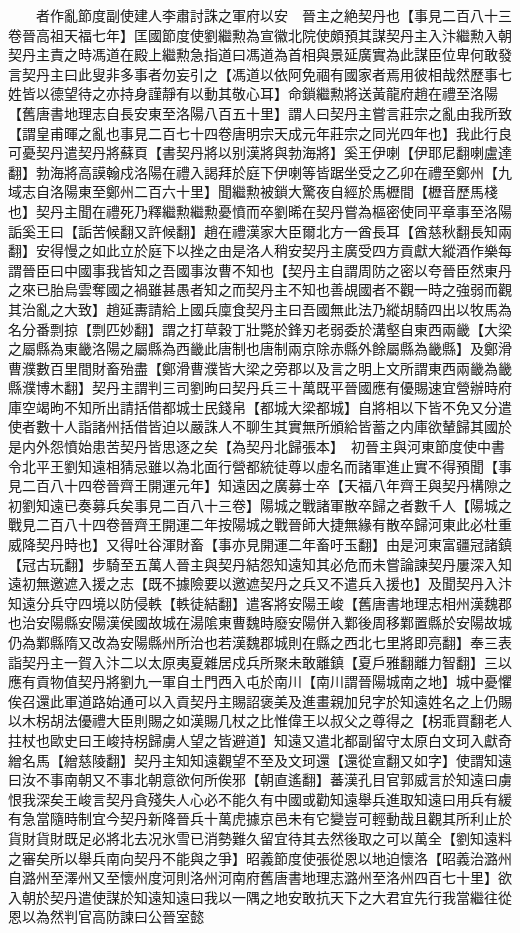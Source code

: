 　　者作亂節度副使建人李肅討誅之軍府以安　晉主之絶契丹也【事見二百八十三卷晉高祖天福七年】匡國節度使劉繼勲為宣徽北院使頗預其謀契丹主入汴繼勲入朝契丹主責之時馮道在殿上繼勲急指道曰馮道為首相與景延廣實為此謀臣位卑何敢發言契丹主曰此叟非多事者勿妄引之【馮道以依阿免祻有國家者焉用彼相哉然歷事七姓皆以德望待之亦持身謹靜有以動其敬心耳】命鎖繼勲將送黃龍府趙在禮至洛陽【舊唐書地理志自長安東至洛陽八百五十里】謂人曰契丹主嘗言莊宗之亂由我所致【謂皇甫暉之亂也事見二百七十四卷唐明宗天成元年莊宗之同光四年也】我此行良可憂契丹遣契丹將蘇頁【書契丹將以别漢將與勃海將】奚王伊喇【伊耶尼翻喇盧達翻】勃海將高謨翰戍洛陽在禮入謁拜於庭下伊喇等皆踞坐受之乙卯在禮至鄭州【九域志自洛陽東至鄭州二百六十里】聞繼勲被鎖大驚夜自經於馬櫪間【櫪音歷馬棧也】契丹主聞在禮死乃釋繼勲繼勲憂憤而卒劉晞在契丹嘗為樞密使同平章事至洛陽詬奚王曰【詬苦候翻又許候翻】趙在禮漢家大臣爾北方一酋長耳【酋慈秋翻長知兩翻】安得慢之如此立於庭下以挫之由是洛人稍安契丹主廣受四方貢獻大縱酒作樂每謂晉臣曰中國事我皆知之吾國事汝曹不知也【契丹主自謂周防之密以夸晉臣然東丹之來已胎烏雲奪國之禍雖甚愚者知之而契丹主不知也善覘國者不觀一時之強弱而觀其治亂之大致】趙延夀請給上國兵廩食契丹主曰吾國無此法乃縱胡騎四出以牧馬為名分番剽掠【剽匹妙翻】謂之打草穀丁壯斃於鋒刃老弱委於溝壑自東西兩畿【大梁之屬縣為東畿洛陽之屬縣為西畿此唐制也唐制兩京除赤縣外餘屬縣為畿縣】及鄭滑曹濮數百里間財畜殆盡【鄭滑曹濮皆大梁之旁郡以及言之明上文所謂東西兩畿為畿縣濮博木翻】契丹主謂判三司劉昫曰契丹兵三十萬既平晉國應有優賜速宜營辦時府庫空竭昫不知所出請括借都城士民錢帛【都城大梁都城】自將相以下皆不免又分遣使者數十人詣諸州括借皆迫以嚴誅人不聊生其實無所頒給皆蓄之内庫欲輦歸其國於是内外怨憤始患苦契丹皆思逐之矣【為契丹北歸張本】　初晉主與河東節度使中書令北平王劉知遠相猜忌雖以為北面行營都統徒尊以虛名而諸軍進止實不得預聞【事見二百八十四卷晉齊王開運元年】知遠因之廣募士卒【天福八年齊王與契丹構隙之初劉知遠已奏募兵矣事見二百八十三卷】陽城之戰諸軍散卒歸之者數千人【陽城之戰見二百八十四卷晉齊王開運二年按陽城之戰晉師大捷無緣有散卒歸河東此必杜重威降契丹時也】又得吐谷渾財畜【事亦見開運二年畜吁玉翻】由是河東富疆冠諸鎮【冠古玩翻】步騎至五萬人晉主與契丹結怨知遠知其必危而未嘗論諫契丹屢深入知遠初無邀遮入援之志【既不據險要以邀遮契丹之兵又不遣兵入援也】及聞契丹入汴知遠分兵守四境以防侵軼【軼徒結翻】遣客將安陽王峻【舊唐書地理志相州漢魏郡也治安陽縣安陽漢侯國故城在湯隂東曹魏時廢安陽併入鄴後周移鄴置縣於安陽故城仍為鄴縣隋又改為安陽縣州所治也若漢魏郡城則在縣之西北七里將即亮翻】奉三表詣契丹主一賀入汴二以太原夷夏雜居戍兵所聚未敢離鎮【夏戶雅翻離力智翻】三以應有貢物值契丹將劉九一軍自土門西入屯於南川【南川謂晉陽城南之地】城中憂懼俟召還此軍道路始通可以入貢契丹主賜詔褒美及進畫親加兒字於知遠姓名之上仍賜以木柺胡法優禮大臣則賜之如漢賜几杖之比惟偉王以叔父之尊得之【柺乖買翻老人拄杖也歐史曰王峻持柺歸虜人望之皆避道】知遠又遣北都副留守太原白文珂入獻奇繒名馬【繒慈陵翻】契丹主知知遠觀望不至及文珂還【還從宣翻又如字】使謂知遠曰汝不事南朝又不事北朝意欲何所俟邪【朝直遙翻】蕃漢孔目官郭威言於知遠曰虜恨我深矣王峻言契丹貪殘失人心必不能久有中國或勸知遠舉兵進取知遠曰用兵有緩有急當隨時制宜今契丹新降晉兵十萬虎據京邑未有它變豈可輕動哉且觀其所利止於貨財貨財既足必將北去况氷雪已消勢難久留宜待其去然後取之可以萬全【劉知遠料之審矣所以舉兵南向契丹不能與之爭】昭義節度使張從恩以地迫懷洛【昭義治潞州自潞州至澤州又至懷州度河則洛州河南府舊唐書地理志潞州至洛州四百七十里】欲入朝於契丹遣使謀於知遠知遠曰我以一隅之地安敢抗天下之大君宜先行我當繼往從恩以為然判官高防諫曰公晉室懿
